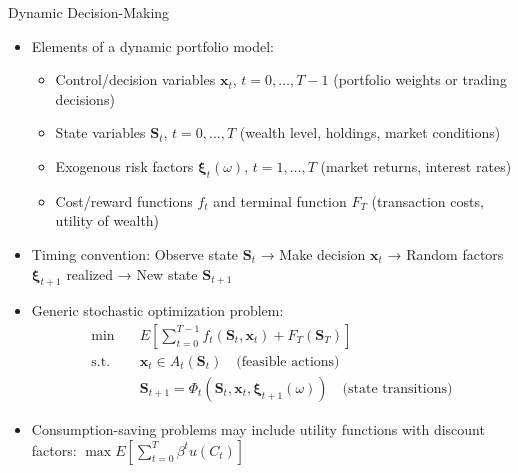 \documentclass[10pt]{beamer}
\begin{document}
\begin{frame}{Dynamic Decision-Making}
  \begin{itemize}[<+->]
    \item Elements of a dynamic portfolio model:
      \begin{itemize}
        \item Control/decision variables $\mathbf{x}_t$, $t = 0, \ldots, T-1$ (portfolio weights or trading decisions)
        \item State variables $\mathbf{S}_t$, $t = 0, \ldots, T$ (wealth level, holdings, market conditions)
        \item Exogenous risk factors $\boldsymbol{\xi}_t(\omega)$, $t = 1, \ldots, T$ (market returns, interest rates)
        \item Cost/reward functions $f_t$ and terminal function $F_T$ (transaction costs, utility of wealth)
      \end{itemize}
    \item Timing convention: Observe state $\mathbf{S}_t$ → Make decision $\mathbf{x}_t$ → Random factors $\boldsymbol{\xi}_{t+1}$ realized → New state $\mathbf{S}_{t+1}$
    \item Generic stochastic optimization problem:
      \begin{align*}
        \min \quad & E\left[\sum_{t=0}^{T-1} f_t(\mathbf{S}_t, \mathbf{x}_t) + F_T(\mathbf{S}_T)\right]\\
        \text{s.t.} \quad & \mathbf{x}_t \in A_t(\mathbf{S}_t) \quad \text{(feasible actions)}\\
        & \mathbf{S}_{t+1} = \Phi_t(\mathbf{S}_t, \mathbf{x}_t, \boldsymbol{\xi}_{t+1}(\omega)) \quad \text{(state transitions)}
      \end{align*}
    \item Consumption-saving problems may include utility functions with discount factors: $\max E\left[\sum_{t=0}^{T} \beta^t u(C_t)\right]$
  \end{itemize}
\end{frame}
\end{document}
